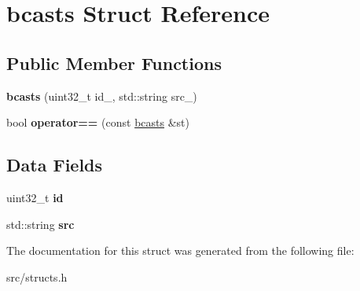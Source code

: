 \hypertarget{structbcasts}{\section{bcasts Struct Reference}
\label{structbcasts}
}
\subsection*{Public Member Functions}
\begin{DoxyCompactItemize}
\item 
\hypertarget{structbcasts_aef827206ae76754a35d2d373a25ca6be}{{\bfseries bcasts} (uint32\-\_\-t id\-\_\-, std\-::string src\-\_\-)}\label{structbcasts_aef827206ae76754a35d2d373a25ca6be}

\item 
\hypertarget{structbcasts_a94063dfe921d2dee1a9a8f5e63058a57}{bool {\bfseries operator==} (const \hyperlink{structbcasts}{bcasts} \&st)}\label{structbcasts_a94063dfe921d2dee1a9a8f5e63058a57}

\end{DoxyCompactItemize}
\subsection*{Data Fields}
\begin{DoxyCompactItemize}
\item 
\hypertarget{structbcasts_adcc0cb59c6231cf2b56b9d3c33e618e2}{uint32\-\_\-t {\bfseries id}}\label{structbcasts_adcc0cb59c6231cf2b56b9d3c33e618e2}

\item 
\hypertarget{structbcasts_a398832cace36378e74fe269ba7064413}{std\-::string {\bfseries src}}\label{structbcasts_a398832cace36378e74fe269ba7064413}

\end{DoxyCompactItemize}


The documentation for this struct was generated from the following file\-:\begin{DoxyCompactItemize}
\item 
src/structs.\-h\end{DoxyCompactItemize}
